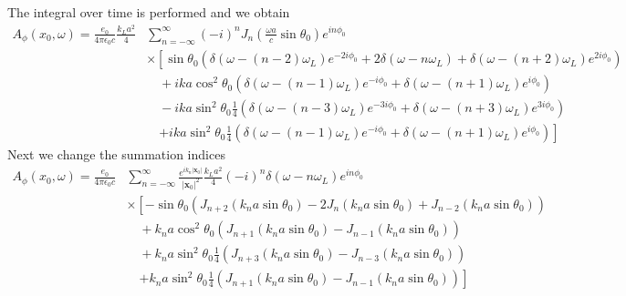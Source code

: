The integral over time is performed and we obtain
\begin{align}
    A_\phi(x_0,\omega)=\frac{e_0 }{4\pi\epsilon_0 c} \frac{k_La^2}4 & \sum_{n=-\infty}^{\infty} (-i)^n J_n(\frac{\omega a}c\sin\theta_0)e^{in\phi_0}\nonumber                                                                             \\
                                                                    & \times\left[{\sin\theta_0}\left(\delta(\omega-(n-2)\omega_L)e^{-2i\phi_0}+2\delta(\omega-n\omega_L)+\delta(\omega-(n+2)\omega_L)e^{2i\phi_0}\right)\right.\nonumber \\
                                                                    & \quad +{ika}\cos^2\theta_0\left(\delta(\omega-(n-1)\omega_L)e^{-i\phi_0}+\delta(\omega-(n+1)\omega_L)e^{i\phi_0}\right)\nonumber                                    \\
                                                                    & \quad-ika\sin^2\theta_0\frac1{4}\left(\delta(\omega-(n-3)\omega_L)e^{-3i\phi_0}+\delta(\omega-(n+3)\omega_L)e^{3i\phi_0}\right)  \nonumber                          \\
                                                                    & \quad\left.+ika\sin^2\theta_0\frac1{4}\left(\delta(\omega-(n-1)\omega_L)e^{-i\phi_0}+\delta(\omega-(n+1)\omega_L)e^{i\phi_0}\right)\right]
\end{align}
Next we change the summation indices
\begin{align}
    A_\phi(x_0,\omega)=\frac{e_0 }{4\pi\epsilon_0 c} & \sum_{n=-\infty}^{\infty}\frac{e^{i k_n|{\bm x}_0|}}{|{\bm x}_0|^2}\frac{k_La^2}4 (-i)^n \delta(\omega-n\omega_L)e^{in\phi_0}\nonumber \\
                                                     & \times\left[-\sin\theta_0\left(J_{n+2}(k_na\sin\theta_0)-2J_n(k_na\sin\theta_0)+J_{n-2}(k_na\sin\theta_0)\right)\right.\nonumber       \\
                                                     & \quad +{k_na}\cos^2\theta_0\left(J_{n+1}(k_na\sin\theta_0)-J_{n-1}(k_na\sin\theta_0)\right)\nonumber                                   \\
                                                     & \quad+k_na\sin^2\theta_0\frac1{4}\left(J_{n+3}(k_na\sin\theta_0)-J_{n-3}(k_na\sin\theta_0)\right)\nonumber                             \\
                                                     & \quad\left.+k_na\sin^2\theta_0\frac1{4}\left(J_{n+1}(k_na\sin\theta_0)-J_{n-1}(k_na\sin\theta_0)\right)\right]
\end{align}

